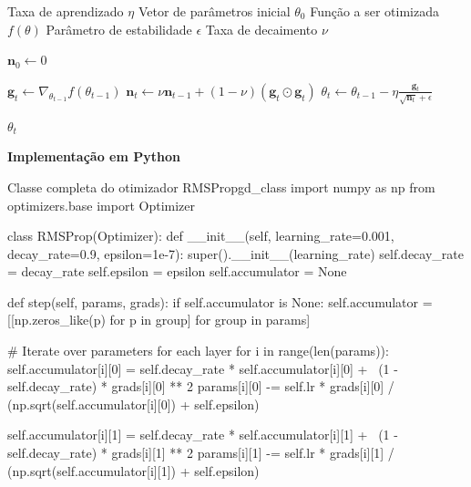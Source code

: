 \begin{algorithm}[H] %
    \caption{RMSProp}
    \label{alg:rmsprop}
    \begin{algorithmic}[1] %

    \Require Taxa de aprendizado $\eta$
    \Require Vetor de parâmetros inicial $\theta_0$
    \Require Função a ser otimizada $f(\theta)$
    \Require Parâmetro de estabilidade $\epsilon$
    \Require Taxa de decaimento $\nu$

    \State $\mathbf{n}_0 \leftarrow 0$ 

        \State $\textbf{g}_t \leftarrow \nabla_{\theta_{t-1}} f(\theta_{t-1})$
        \State $\textbf{n}_t \leftarrow \nu \textbf{n}_{t-1} + (1 - \nu) (\mathbf{g}_t \odot \mathbf{g}_t)$
        \State $\theta_t \leftarrow \theta_{t-1} - \eta \frac{\textbf{g}_t}{\sqrt{\textbf{n}_t} + \epsilon}$
    \EndWhile

    \State \Return $\theta_t$ 
    \end{algorithmic}
\end{algorithm}

\textbf{Implementação em Python}

\begin{codelisting}{Classe completa do otimizador RMSProp}{gd_class}
import numpy as np
from optimizers.base import Optimizer

class RMSProp(Optimizer):
    def __init__(self, learning_rate=0.001, decay_rate=0.9, epsilon=1e-7):
        super().__init__(learning_rate)
        self.decay_rate = decay_rate
        self.epsilon = epsilon
        self.accumulator = None

    def step(self, params, grads):
        if self.accumulator is None:
            self.accumulator = [[np.zeros_like(p) for p in group] for group in params]

        # Iterate over parameters for each layer
        for i in range(len(params)):
            self.accumulator[i][0] = self.decay_rate * self.accumulator[i][0] + \
                                     (1 - self.decay_rate) * grads[i][0] ** 2
            params[i][0] -= self.lr * grads[i][0] / (np.sqrt(self.accumulator[i][0]) + self.epsilon)

            self.accumulator[i][1] = self.decay_rate * self.accumulator[i][1] + \
                                     (1 - self.decay_rate) * grads[i][1] ** 2
            params[i][1] -= self.lr * grads[i][1] / (np.sqrt(self.accumulator[i][1]) + self.epsilon)
\end{codelisting}

